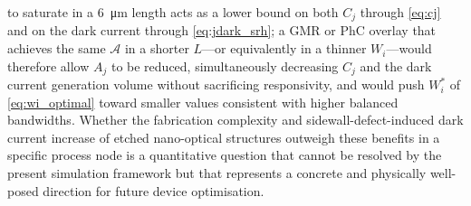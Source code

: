 to saturate in a \SI{6}{\micro\metre} length acts as a lower bound on both
$C_j$ through \cref{eq:cj} and on the dark current through
\cref{eq:jdark_srh}; a GMR or PhC overlay that achieves the same $\mathcal{A}$
in a shorter $L$—or equivalently in a thinner $W_i$—would therefore allow
$A_j$ to be reduced, simultaneously decreasing $C_j$ and the dark current
generation volume without sacrificing responsivity, and would push $W_i^*$ of
\cref{eq:wi_optimal} toward smaller values consistent with higher balanced
bandwidths. Whether the fabrication complexity and sidewall-defect-induced dark
current increase of etched nano-optical structures outweigh these benefits in a
specific process node is a quantitative question that cannot be resolved by the
present simulation framework but that represents a concrete and physically
well-posed direction for future device optimisation.

